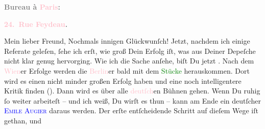            \pstart
           \begin{otherlanguage}{french}\textcolor{gray}{\textbf{\textbf{Bureau à \textcolor{pink}{Paris}{}\ledrightnote{\textcolor{pink}{Paris}}:}}}\end{otherlanguage}\pend
           \pstart
           \begin{otherlanguage}{french}\textcolor{gray}{\textbf{\textbf{\textcolor{pink}{24. Rue Feydeau}{}\ledrightnote{\textcolor{pink}{rue Feydeau}}.}}}\end{otherlanguage}\pend
           \pstart\center{}Mein lieber Freund,\pend\pstart
           Nochmals innigen Glückwunſch!\pend
           \pstart
           Jetzt, nachdem ich einige Referate geleſen, ſehe ich \strikeout{\textcolor{gray}{w}} erſt, wie groß Dein Erfolg iſt, was aus Deiner Depeſche nicht klar genug
               hervorging. Wie ich die Sache anſehe, biſt Du jetzt \label{K_L02751-1v}\label{K_L02751-1h}. Nach dem \textcolor{pink}{Wien}{}\ledrightnote{\textcolor{pink}{Wien}}er Erfolge werden die \textcolor{pink}{Berlin}{}\ledrightnote{\textcolor{pink}{Berlin}}er bald
               mit dem \textcolor{green}{Stücke}{} herauskommen.
               Dort wird es einen nicht minder großen Erfolg haben und eine noch intelligentere
               Kritik finden (\label{K_L02751-2v}\label{K_L02751-2h}).
               Dann wird {\pb}es über alle \textcolor{pink}{deutſch}{}en Bühnen gehen. Wenn Du ruhig ſo
               weiter arbeiteſt – und ich weiß, Du wirſt es thun – kann am Ende ein deutſcher \textsc{\textcolor{blue}{Emile Augier}{}\ledrightnote{\textcolor{blue}{Émile Augier}}} daraus werden. Der erſte entſcheidende Schritt auf dieſem Wege iſt gethan, und
